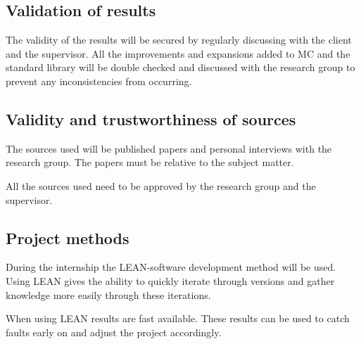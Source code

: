 \subsection{Validation of results}
The validity of the results will be secured by regularly discussing with the client and the supervisor.
All the improvements and expansions added to MC and the standard library will be double checked and discussed with the research group to prevent any inconsistencies from occurring.


\subsection{Validity and trustworthiness of sources}
The sources used will be published papers and personal interviews with the research group.
The papers must be relative to the subject matter.

All the sources used need to be approved by the research group and the supervisor.


\subsection{Project methods}
During the internship the LEAN-software development method will be used\cite{ries2011lean}.
Using LEAN gives the ability to quickly iterate through versions and gather knowledge more easily through these iterations.

When using LEAN results are fast available.
These results can be used to catch faults early on and adjust the project accordingly.



